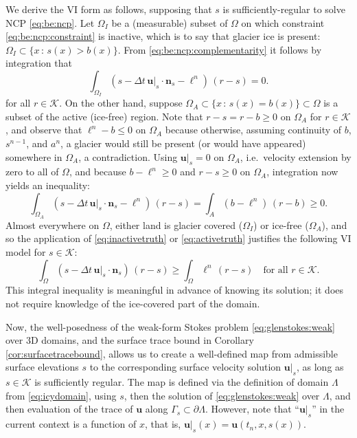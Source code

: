 \documentclass[hidelinks,onefignum,onetabnum,final]{siamart220329}  %
\newcommand{\bn}{\mathbf{n}}
\newcommand{\bu}{\mathbf{u}}
\newcommand{\cK}{\mathcal{K}}
\begin{document}
We derive the VI form as follows, supposing that $s$ is sufficiently-regular to solve NCP \eqref{eq:be:ncp}.  Let $\Omega_I$ be a (measurable) subset of $\Omega$ on which constraint \eqref{eq:be:ncp:constraint} is inactive, which is to say that glacier ice is present: $\Omega_I \subset \{x\,:\,s(x)>b(x)\}$.  From \eqref{eq:be:ncp:complementarity} it follows by integration that
\begin{equation}
\int_{\Omega_I} \left(s - \Delta t\,\bu|_s \cdot \bn_s - \ell^n\right)\,(r-s) = 0.  \label{eq:inactivetruth}
\end{equation}
for all $r\in\cK$.  On the other hand, suppose $\Omega_A \subset \{x\,:\,s(x)=b(x)\} \subset \Omega$ is a subset of the active (ice-free) region.  Note that $r-s=r-b\ge 0$ on $\Omega_A$ for $r\in\cK$, and observe that $\ell^n - b \le 0$ on $\Omega_A$ because otherwise, assuming continuity of $b$, $s^{n-1}$, and $a^n$, a glacier would still be present (or would have appeared) somewhere in $\Omega_A$, a contradiction.  Using $\bu|_s=0$ on $\Omega_A$, i.e.~velocity extension by zero to all of $\Omega$, and because $b-\ell^n \ge 0$ and $r-s\ge 0$ on $\Omega_A$, integration now yields an inequality:
\begin{equation}
\int_{\Omega_A} \left(s - \Delta t\,\bu|_s \cdot \bn_s - \ell^n\right)\,(r-s) = \int_A \left(b - \ell^n\right)\,(r-b) \ge 0.  \label{eq:activetruth}
\end{equation}
Almost everywhere on $\Omega$, either land is glacier covered ($\Omega_I$) or ice-free ($\Omega_A$), and so the application of \eqref{eq:inactivetruth} or \eqref{eq:activetruth} justifies the following VI model for $s \in \cK$:
\begin{equation}
\int_\Omega \left(s - \Delta t\,\bu|_s \cdot \bn_s\right)\,(r-s) \ge \int_\Omega \ell^n \,(r-s) \quad \text{for all } r \in \cK. \label{eq:be:viearly}
\end{equation}
This integral inequality is meaningful in advance of knowing its solution; it does not require knowledge of the ice-covered part of the domain.
	
Now, the well-posedness of the weak-form Stokes problem \eqref{eq:glenstokes:weak} over 3D domains, and the surface trace bound in Corollary \ref{cor:surfacetracebound}, allows us to create a well-defined map from admissible surface elevations $s$ to the corresponding surface velocity solution $\bu|_s$, as long as $s\in\cK$ is sufficiently regular.  The map is defined via the definition of domain $\Lambda$ from \eqref{eq:icydomain}, using $s$, then the solution of \eqref{eq:glenstokes:weak} over $\Lambda$, and then evaluation of the trace of $\bu$ along $\Gamma_s \subset \partial\Lambda$.  However, note that ``$\bu|_s$'' in the current context is a function of $x$, that is, $\bu|_s(x) = \bu(t_n,x,s(x))$.
\end{document}
